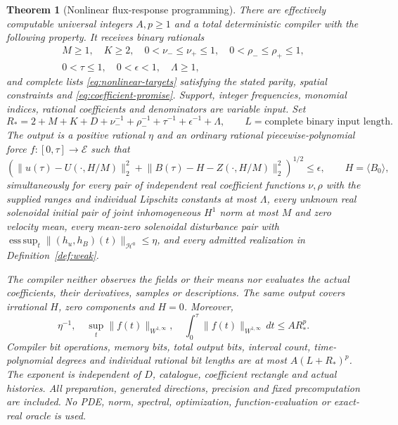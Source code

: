 \documentclass[11pt,a4paper]{amsart}
\newtheorem{theorem}{Theorem}[section]
\theoremstyle{definition}
\theoremstyle{remark}
\numberwithin{equation}{section}
\newcommand{\Hcal}{\mathcal H}
\newcommand{\Ecal}{\mathcal E}
\newcommand{\norm}[1]{\lVert #1\rVert}
\newcommand{\mean}[1]{\langle #1\rangle}
\newcommand{\esssup}{\operatorname*{ess\,sup}}
\begin{document}
\begin{theorem}[Nonlinear flux-response programming]\label{thm:nonlinear}
There are effectively computable universal integers $A,p\ge1$ and a total
 deterministic compiler with the following property. It receives binary
rationals
\[
 \begin{gathered}
 M\ge1,\quad K\ge2,\quad
 0<\nu_-\le\nu_+\le1,\quad0<\rho_-\le\rho_+\le1,\\
 0<\tau\le1,\quad0<\epsilon<1,\quad\Lambda\ge1,
 \end{gathered}
\]
and complete lists \eqref{eq:nonlinear-targets} satisfying the stated
parity, spatial constraints and \eqref{eq:coefficient-promise}. Support,
integer frequencies, monomial indices, rational coefficients and denominators
are variable input. Set
\begin{equation}\label{eq:nonlinear-R}
 R_*=2+M+K+D+\nu_-^{-1}+\rho_-^{-1}
                  +\tau^{-1}+\epsilon^{-1}+\Lambda,
 \qquad L=\text{complete binary input length}.
\end{equation}
The output is a positive rational $\eta$ and an ordinary rational
piecewise-polynomial force $f:[0,\tau]\to\Ecal$ such that
\begin{equation}\label{eq:nonlinear-endpoint}
 \left(\norm{u(\tau)-U(\cdot,H/M)}_2^2+
 \norm{B(\tau)-H-Z(\cdot,H/M)}_2^2\right)^{1/2}\le\epsilon,
 \qquad H=\mean{B_0},
\end{equation}
simultaneously for every pair of independent real coefficient functions
$\nu,\rho$ with the supplied ranges and individual Lipschitz constants at
most $\Lambda$, every unknown real solenoidal initial pair of joint
inhomogeneous $H^1$ norm at most $M$ and zero velocity mean, every mean-zero
solenoidal disturbance pair with
$\esssup_t\norm{(h_u,h_B)(t)}_{\Hcal^0}\le\eta$, and every admitted
realization in Definition~\ref{def:weak}.

The compiler neither observes the fields or their means nor evaluates the
actual coefficients, their derivatives, samples or descriptions. The same
output covers irrational $H$, zero components and $H=0$. Moreover,
\begin{equation}\label{eq:nonlinear-physicalcost}
 \eta^{-1},\quad\sup_t\norm{f(t)}_{W^{1,\infty}},\quad
 \int_0^\tau\norm{f(t)}_{W^{1,\infty}}\,dt\le A R_*^p.
\end{equation}
Compiler bit operations, memory bits, total output bits, interval count,
time-polynomial degrees and individual rational bit lengths are at most
$A(L+R_*)^p$. The exponent is independent of $D$, catalogue, coefficient
rectangle and actual histories. All preparation, generated directions,
precision and fixed precomputation are included. No PDE, norm, spectral,
optimization, function-evaluation or exact-real oracle is used.
\end{theorem}
\end{document}
